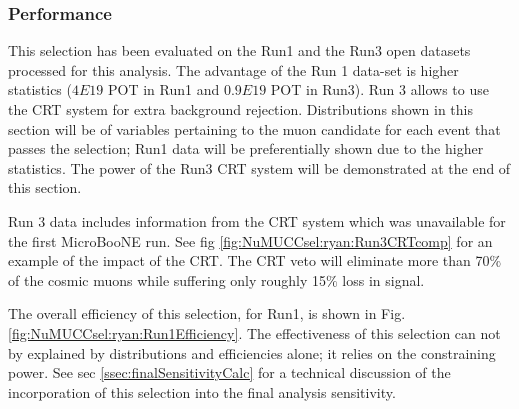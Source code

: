 \subsubsection{Performance}
\label{sssec:NuMUCCsel:constr:performance}

\par This selection has been evaluated on the Run1 and the Run3 open datasets processed for this analysis. The advantage of the Run 1 data-set is higher statistics ($4E19$ POT in Run1 and $0.9E19$ POT in Run3). Run 3 allows to use the CRT system for extra background rejection. Distributions shown in this section will be of variables pertaining to the muon candidate for each event that passes the selection; Run1 data will be preferentially shown due to the higher statistics. The power of the Run3 CRT system will be demonstrated at the end of this section.

\par Run 3 data includes information from the CRT system which was unavailable for the first MicroBooNE run. See fig \ref{fig:NuMUCCsel:ryan:Run3CRTcomp} for an example of the impact of the CRT. The CRT veto will eliminate more than 70$\%$ of the cosmic muons while suffering only roughly 15$\%$ loss in signal.

\par The overall efficiency of this selection, for Run1, is shown in Fig. \ref{fig:NuMUCCsel:ryan:Run1Efficiency}. The effectiveness of this selection can not by explained by distributions and efficiencies alone; it relies on the constraining power. See sec \ref{ssec:finalSensitivityCalc} for a technical discussion of the incorporation of this selection into the final analysis sensitivity.

